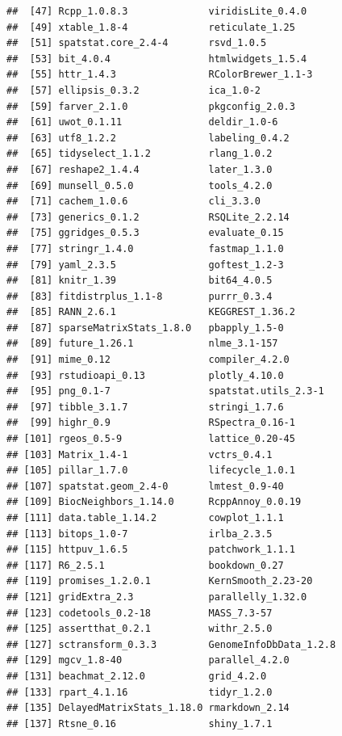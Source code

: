 \documentclass[
  openany]{book}
\begin{document}
\begin{verbatim}
##  [47] Rcpp_1.0.8.3              viridisLite_0.4.0        
##  [49] xtable_1.8-4              reticulate_1.25          
##  [51] spatstat.core_2.4-4       rsvd_1.0.5               
##  [53] bit_4.0.4                 htmlwidgets_1.5.4        
##  [55] httr_1.4.3                RColorBrewer_1.1-3       
##  [57] ellipsis_0.3.2            ica_1.0-2                
##  [59] farver_2.1.0              pkgconfig_2.0.3          
##  [61] uwot_0.1.11               deldir_1.0-6             
##  [63] utf8_1.2.2                labeling_0.4.2           
##  [65] tidyselect_1.1.2          rlang_1.0.2              
##  [67] reshape2_1.4.4            later_1.3.0              
##  [69] munsell_0.5.0             tools_4.2.0              
##  [71] cachem_1.0.6              cli_3.3.0                
##  [73] generics_0.1.2            RSQLite_2.2.14           
##  [75] ggridges_0.5.3            evaluate_0.15            
##  [77] stringr_1.4.0             fastmap_1.1.0            
##  [79] yaml_2.3.5                goftest_1.2-3            
##  [81] knitr_1.39                bit64_4.0.5              
##  [83] fitdistrplus_1.1-8        purrr_0.3.4              
##  [85] RANN_2.6.1                KEGGREST_1.36.2          
##  [87] sparseMatrixStats_1.8.0   pbapply_1.5-0            
##  [89] future_1.26.1             nlme_3.1-157             
##  [91] mime_0.12                 compiler_4.2.0           
##  [93] rstudioapi_0.13           plotly_4.10.0            
##  [95] png_0.1-7                 spatstat.utils_2.3-1     
##  [97] tibble_3.1.7              stringi_1.7.6            
##  [99] highr_0.9                 RSpectra_0.16-1          
## [101] rgeos_0.5-9               lattice_0.20-45          
## [103] Matrix_1.4-1              vctrs_0.4.1              
## [105] pillar_1.7.0              lifecycle_1.0.1          
## [107] spatstat.geom_2.4-0       lmtest_0.9-40            
## [109] BiocNeighbors_1.14.0      RcppAnnoy_0.0.19         
## [111] data.table_1.14.2         cowplot_1.1.1            
## [113] bitops_1.0-7              irlba_2.3.5              
## [115] httpuv_1.6.5              patchwork_1.1.1          
## [117] R6_2.5.1                  bookdown_0.27            
## [119] promises_1.2.0.1          KernSmooth_2.23-20       
## [121] gridExtra_2.3             parallelly_1.32.0        
## [123] codetools_0.2-18          MASS_7.3-57              
## [125] assertthat_0.2.1          withr_2.5.0              
## [127] sctransform_0.3.3         GenomeInfoDbData_1.2.8   
## [129] mgcv_1.8-40               parallel_4.2.0           
## [131] beachmat_2.12.0           grid_4.2.0               
## [133] rpart_4.1.16              tidyr_1.2.0              
## [135] DelayedMatrixStats_1.18.0 rmarkdown_2.14           
## [137] Rtsne_0.16                shiny_1.7.1
\end{verbatim}

\vspace{-100pt}

  
\end{document}
